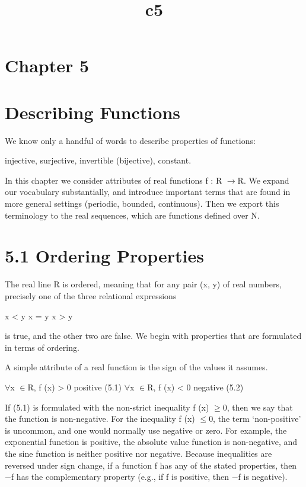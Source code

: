 \documentclass[11pt]{article}
\title{c5}
\date{}
\theoremstyle{plain}
\theoremstyle{definition}
\begin{document}
\maketitle

\section{Chapter 5}

\section{Describing Functions}

We know only a handful of words to describe properties of functions:

injective, surjective, invertible (bijective), constant.

In this chapter we consider attributes of real functions f : R $\to$R. We expand our vocabulary substantially, and introduce important terms that are found in more general settings (periodic, bounded, continuous). Then we export this terminology to the real sequences, which are functions defined over N.

\section{5.1 Ordering Properties}

The real line R is ordered, meaning that for any pair (x, y) of real numbers, precisely one of the three relational expressions

x < y x = y x > y

is true, and the other two are false. We begin with properties that are formulated in terms of ordering.

A simple attribute of a real function is the sign of the values it assumes.

$\forall$x $\in$R, f (x) > 0 positive (5.1) $\forall$x $\in$R, f (x) < 0 negative (5.2)

If (5.1) is formulated with the non-strict inequality f (x) $\geq$0, then we say that the function is non-negative. For the inequality f (x) $\leq$0, the term `non-positive' is uncommon, and one would normally use negative or zero. For example, the exponential function is positive, the absolute value function is non-negative, and the sine function is neither positive nor negative. Because inequalities are reversed under sign change, if a function f has any of the stated properties, then $-$f has the complementary property (e.g., if f is positive, then $-$f is negative).
\end{document}
